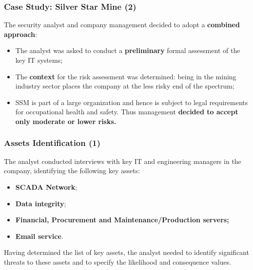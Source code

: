 \documentclass[xcolor ={table,usenames,dvipsnames}]{beamer}
\theoremstyle{definition}
\begin{document}
	\begin{frame}
		\frametitle{Case Study: Silver Star Mine (2)}
		The security analyst and company management decided to adopt a \textbf{combined approach}:
		\begin{itemize}
			\item The analyst was asked to conduct a \textbf{preliminary} formal assessment of the key IT systems;
			\item The \textbf{context} for the risk assessment was determined: being in the mining industry sector places the company at the less risky end of the ­spectrum;
			\item SSM is part of a large organization and hence is subject to legal requirements for occupational health and safety. Thus management \textbf{decided to accept only moderate or lower risks.}
		\end{itemize}
	\end{frame}

	\begin{frame}
		\frametitle{Assets Identification (1)}
		The analyst conducted interviews with key IT and engineering managers in the company, identifying the following key assets:
		\begin{itemize}
			\item \textbf{SCADA Network};
			\item \textbf{Data integrity};
			\item \textbf{Financial, Procurement and Maintenance/Production servers;}
			\item \textbf{Email service}.
		\end{itemize}
		Having determined the list of key assets, the analyst needed to identify significant threats to these assets and to specify the likelihood and consequence values.
	\end{frame}
\end{document}
